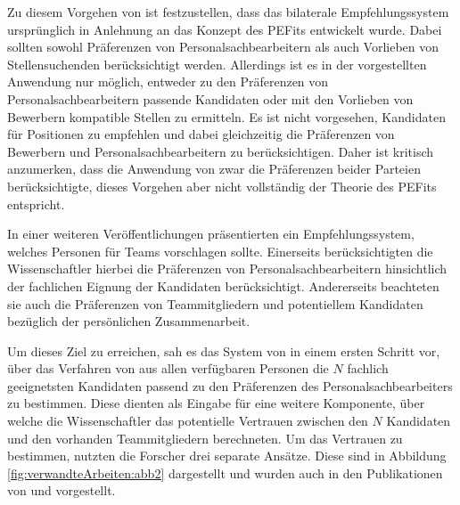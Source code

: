 Zu diesem Vorgehen von \textcite[S. 3ff.]{malinowski:2006} ist festzustellen, dass das bilaterale Empfehlungssystem ursprünglich in Anlehnung an das Konzept des \acp{PEFit} entwickelt wurde. Dabei sollten sowohl Präferenzen von Personalsachbearbeitern als auch Vorlieben von Stellensuchenden berücksichtigt werden. Allerdings ist es in der vorgestellten Anwendung nur möglich, entweder zu den Präferenzen von Personalsachbearbeitern passende Kandidaten oder mit den Vorlieben von Bewerbern kompatible Stellen zu ermitteln. Es ist nicht vorgesehen, Kandidaten für Positionen zu empfehlen und dabei gleichzeitig die Präferenzen von Bewerbern und Personalsachbearbeitern zu berücksichtigen. Daher ist kritisch anzumerken, dass die Anwendung von \textcite[S. 3ff.]{malinowski:2006} zwar die Präferenzen beider Parteien berücksichtigte, dieses Vorgehen aber nicht vollständig der Theorie des \acp{PEFit} entspricht.

In einer weiteren Veröffentlichungen präsentierten \textcite[S. 1]{malinowski:2005} ein Empfehlungssystem, welches Personen für Teams vorschlagen sollte. Einerseits berücksichtigten die Wissenschaftler hierbei die Präferenzen von Personalsachbearbeitern hinsichtlich der fachlichen Eignung der Kandidaten berücksichtigt. Andererseits beachteten sie auch die Präferenzen von Teammitgliedern und potentiellem Kandidaten bezüglich der persönlichen Zusammenarbeit.

Um dieses Ziel zu erreichen, sah es das System von \textcite[S. 4ff.]{malinowski:2005} in einem ersten Schritt vor, über das Verfahren von \textcite[S. 8ff.]{faerber:2003} aus allen verfügbaren Personen die $N$ fachlich geeignetsten Kandidaten passend zu den Präferenzen des Personalsachbearbeiters zu bestimmen. Diese dienten als Eingabe für eine weitere Komponente, über welche die Wissenschaftler das potentielle Vertrauen zwischen den $N$ Kandidaten und den vorhanden Teammitgliedern berechneten. Um das Vertrauen zu bestimmen, nutzten die Forscher drei separate Ansätze. Diese sind in Abbildung \ref{fig:verwandteArbeiten:abb2} dargestellt und wurden auch in den Publikationen von \textcite[S. 5ff.]{keim:2005} und \textcite[S. 6ff.]{malinowski:2008} vorgestellt.

